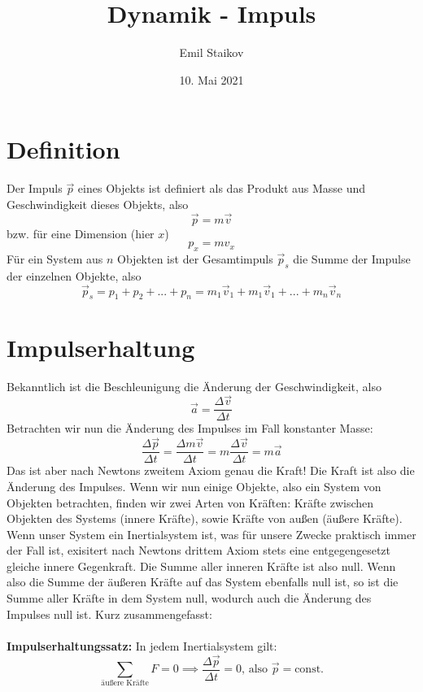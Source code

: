 \documentclass[11pt]{article}
\title{Dynamik - Impuls}
\author{Emil Staikov}
\date{10. Mai 2021}
\begin{document}
\maketitle

\section{Definition}
Der Impuls $\vec{p}$ eines Objekts ist definiert als das Produkt aus Masse und Geschwindigkeit dieses Objekts, also 
\begin{equation*}
    \vec{p} = m\vec{v} 
\end{equation*}
bzw. für eine Dimension (hier $x$) 
\begin{equation*}
    p_x = mv_x
\end{equation*}
Für ein System aus $n$ Objekten ist der Gesamtimpuls $\vec{p}_s$ die Summe der Impulse der einzelnen Objekte, also 
\begin{equation*}
    \vec{p}_s = p_1 + p_2 + ... + p_n = m_1\vec{v}_1 + m_1\vec{v}_1 + ... + m_n\vec{v}_n
\end{equation*}

\section{Impulserhaltung}
Bekanntlich ist die Beschleunigung die Änderung der Geschwindigkeit, also
\begin{equation*}
    \vec{a} = \frac{\Delta \vec{v}}{\Delta t}
\end{equation*}
Betrachten wir nun die Änderung des Impulses im Fall konstanter Masse: 
\begin{equation*}
    \frac{\Delta \vec{p}}{\Delta t} = \frac{\Delta m\vec{v}}{\Delta t} = m \frac{\Delta \vec{v}}{\Delta t} = m\vec{a}
\end{equation*}
Das ist aber nach Newtons zweitem Axiom genau die Kraft! Die Kraft ist also die Änderung des Impulses. Wenn wir nun einige Objekte, also ein System von Objekten betrachten, finden wir zwei Arten von Kräften: Kräfte zwischen Objekten des Systems (innere Kräfte), sowie Kräfte von außen (äußere Kräfte). Wenn unser System ein Inertialsystem ist, was für unsere Zwecke praktisch immer der Fall ist, exisitert nach Newtons drittem Axiom stets eine entgegengesetzt gleiche innere Gegenkraft. Die Summe aller inneren Kräfte ist also null. Wenn also die Summe der äußeren Kräfte auf das System ebenfalls null ist, so ist die Summe aller Kräfte in dem System null, wodurch auch die Änderung des Impulses null ist. Kurz zusammengefasst: \\\\ 
\textbf{Impulserhaltungssatz:} In jedem Inertialsystem gilt: 
\begin{equation*}
    \sum_{\text{äußere Kräfte}} F = 0 \implies \frac{\Delta \vec{p}}{\Delta t} = 0 \text{, also } \vec{p} = \text{const.}
\end{equation*}
\end{document}
